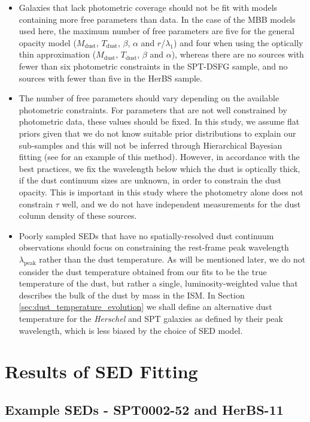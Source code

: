 \begin{itemize}
	\item Galaxies that lack photometric coverage should not be fit with models containing more free parameters than data. In the case of the MBB models used here, the maximum number of free parameters are five for the general opacity model ($M_{\textrm{dust}}$, $T_{\textrm{dust}}$, $\beta$, $\alpha$ and $r$/$\lambda_1$) and four when using the optically thin approximation ($M_{\textrm{dust}}$, $T_{\textrm{dust}}$, $\beta$ and $\alpha$), whereas there are no sources with fewer than six photometric constraints in the SPT-DSFG sample, and no sources with fewer than five in the HerBS sample.
	\item The number of free parameters should vary depending on the available photometric constraints. For parameters that are not well constrained by photometric data, these values should be fixed. In this study, we assume flat priors given that we do not know suitable prior distributions to explain our sub-samples and this will not be inferred through Hierarchical Bayesian fitting (see \citealt{Lamperti_2019} for an example of this method). However, in accordance with the best practices, we fix the wavelength below which the dust is optically thick, if the dust continuum sizes are unknown, in order to constrain the dust opacity. This is important in this study where the photometry alone does not constrain $\tau$ well, and we do not have independent measurements for the dust column density of these sources. 
	\item Poorly sampled SEDs that have no spatially-resolved dust continuum observations should focus on constraining the rest-frame peak wavelength $\lambda_{\textrm{peak}}$ rather than the dust temperature. As will be mentioned later, we do not consider the dust temperature obtained from our fits to be the true temperature of the dust, but rather a single, luminosity-weighted value that describes the bulk of the dust by mass in the ISM. In Section \ref{sec:dust_temperature_evolution} we shall define an alternative dust temperature for the \textit{Herschel} and SPT galaxies as defined by their peak wavelength, which is less biased by the choice of SED model.
\end{itemize}

\section{Results of SED Fitting}

\subsection{Example SEDs - SPT0002-52 and HerBS-11}

